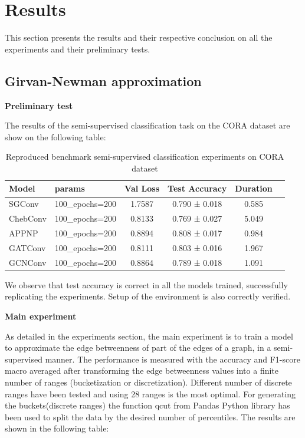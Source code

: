 \newpage
\section{Results}

This section presents the results and their respective conclusion on all the experiments and their preliminary tests.

\subsection{Girvan-Newman approximation}


\textbf{Preliminary test}

The results of the semi-supervised classification task on the CORA dataset are show on the following table:


\begin{table}[H]
\centering
\begin{tabular}{|llccc|c}
\hline
    Model &           params &   Val Loss &   Test Accuracy &   Duration \\
\hline
   SGConv &   100\_epochs=200 &     1.7587 &   0.790 ± 0.018 &      0.585 \\
 ChebConv &   100\_epochs=200 &     0.8133 &   0.769 ± 0.027 &      5.049 \\
    APPNP &   100\_epochs=200 &     0.8894 &   0.808 ± 0.017 &      0.984 \\
  GATConv &   100\_epochs=200 &     0.8111 &   0.803 ± 0.016 &      1.967 \\
  GCNConv &   100\_epochs=200 &     0.8864 &   0.789 ± 0.018 &      1.091 \\
\hline
\end{tabular}
\label{preliminar_GN}\caption{Reproduced benchmark semi-supervised classification experiments on CORA dataset }
\end{table}

We observe that test accuracy is correct in all the models trained, successfully replicating the experiments. Setup of the environment is also correctly verified.




\textbf{Main experiment}

As detailed in the experiments section, the main experiment is to train a model to approximate the edge betweenness of part of the edges of a graph, in a semi-supervised manner. The performance is measured with the accuracy and F1-score macro averaged after transforming the edge betweenness values into a finite number of ranges (bucketization or discretization). Different number of discrete ranges have been tested and using 28 ranges is the most optimal. For generating the buckets(discrete ranges) the function qcut from Pandas Python library has been used to split the data by the desired number of percentiles. The results are shown in the following table:


